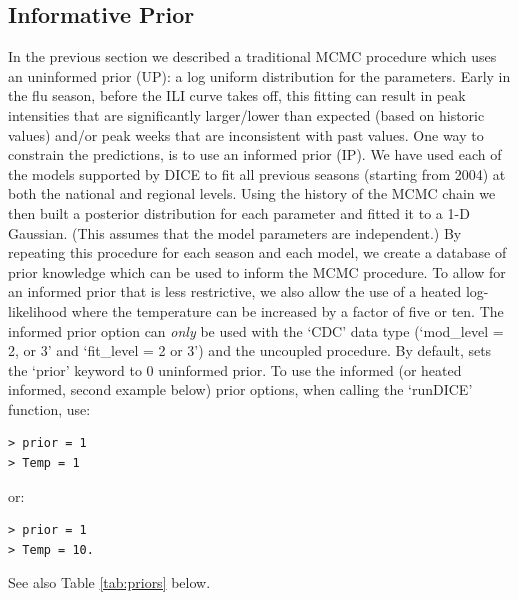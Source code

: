 \documentclass[a4paper]{article}
\begin{document}
%

\subsection{Informative Prior}
\label{sec:IP}
In the previous section we described a traditional MCMC procedure which uses an uninformed prior (UP): a log uniform distribution for the parameters.  Early in the flu season, before the ILI curve takes off, this fitting can result in peak intensities that are significantly larger/lower than expected (based on historic values) and/or peak weeks that are inconsistent with past values.  One way to constrain the predictions, is to use an informed prior (IP). We have used each of the models supported by DICE to fit all previous seasons (starting from 2004) at both the national and regional levels. Using the history of the MCMC chain we then built a posterior distribution for each parameter and fitted it to a 1-D Gaussian.  (This assumes that the model parameters are independent.) By repeating this procedure for each season and each model, we create a database of prior knowledge which can be used to inform the MCMC procedure.  To allow for an informed prior that is less restrictive, we also allow the use of a heated log-likelihood where the temperature can be increased by a factor of five or ten. The informed prior option can \textit{only} be used with the `CDC' data type (`mod\_level = 2, or 3' and `fit\_level = 2 or 3') and the uncoupled procedure. By default,  sets the `prior' keyword to 0 {uninformed prior}.  To use the informed (or heated informed, second example below) prior options, when calling the `runDICE' function, use:

\begin{verbatim}
> prior = 1
> Temp = 1
\end{verbatim}
or:
\begin{verbatim}
> prior = 1
> Temp = 10.
\end{verbatim}
See also Table \ref{tab:priors} below.
\end{document}
